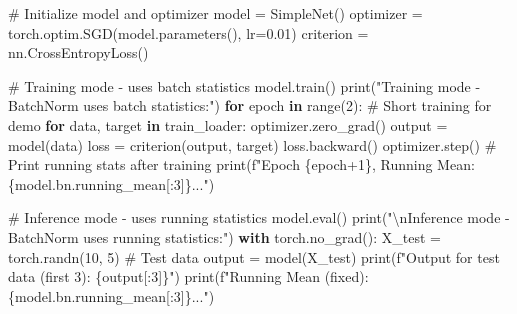 \documentclass[
  letterpaper,
  DIV=11,
  numbers=noendperiod]{scrreprt}
\newenvironment{Shaded}{\begin{snugshade}}{\end{snugshade}}
\newcommand{\BuiltInTok}[1]{\textcolor[rgb]{0.00,0.23,0.31}{#1}}
\newcommand{\CharTok}[1]{\textcolor[rgb]{0.13,0.47,0.30}{#1}}
\newcommand{\CommentTok}[1]{\textcolor[rgb]{0.37,0.37,0.37}{#1}}
\newcommand{\ControlFlowTok}[1]{\textcolor[rgb]{0.00,0.23,0.31}{\textbf{#1}}}
\newcommand{\DecValTok}[1]{\textcolor[rgb]{0.68,0.00,0.00}{#1}}
\newcommand{\FloatTok}[1]{\textcolor[rgb]{0.68,0.00,0.00}{#1}}
\newcommand{\KeywordTok}[1]{\textcolor[rgb]{0.00,0.23,0.31}{\textbf{#1}}}
\newcommand{\NormalTok}[1]{\textcolor[rgb]{0.00,0.23,0.31}{#1}}
\newcommand{\OperatorTok}[1]{\textcolor[rgb]{0.37,0.37,0.37}{#1}}
\newcommand{\SpecialCharTok}[1]{\textcolor[rgb]{0.37,0.37,0.37}{#1}}
\newcommand{\SpecialStringTok}[1]{\textcolor[rgb]{0.13,0.47,0.30}{#1}}
\newcommand{\StringTok}[1]{\textcolor[rgb]{0.13,0.47,0.30}{#1}}
\begin{document}
\begin{Shaded}
\begin{Highlighting}[]
\CommentTok{\# Initialize model and optimizer}
\NormalTok{model }\OperatorTok{=}\NormalTok{ SimpleNet()}
\NormalTok{optimizer }\OperatorTok{=}\NormalTok{ torch.optim.SGD(model.parameters(), lr}\OperatorTok{=}\FloatTok{0.01}\NormalTok{)}
\NormalTok{criterion }\OperatorTok{=}\NormalTok{ nn.CrossEntropyLoss()}

\CommentTok{\# Training mode {-} uses batch statistics}
\NormalTok{model.train()}
\BuiltInTok{print}\NormalTok{(}\StringTok{"Training mode {-} BatchNorm uses batch statistics:"}\NormalTok{)}
\ControlFlowTok{for}\NormalTok{ epoch }\KeywordTok{in} \BuiltInTok{range}\NormalTok{(}\DecValTok{2}\NormalTok{):  }\CommentTok{\# Short training for demo}
    \ControlFlowTok{for}\NormalTok{ data, target }\KeywordTok{in}\NormalTok{ train\_loader:}
\NormalTok{        optimizer.zero\_grad()}
\NormalTok{        output }\OperatorTok{=}\NormalTok{ model(data)}
\NormalTok{        loss }\OperatorTok{=}\NormalTok{ criterion(output, target)}
\NormalTok{        loss.backward()}
\NormalTok{        optimizer.step()}
    \CommentTok{\# Print running stats after training}
    \BuiltInTok{print}\NormalTok{(}\SpecialStringTok{f"Epoch }\SpecialCharTok{\{}\NormalTok{epoch}\OperatorTok{+}\DecValTok{1}\SpecialCharTok{\}}\SpecialStringTok{, Running Mean: }\SpecialCharTok{\{}\NormalTok{model}\SpecialCharTok{.}\NormalTok{bn}\SpecialCharTok{.}\NormalTok{running\_mean[:}\DecValTok{3}\NormalTok{]}\SpecialCharTok{\}}\SpecialStringTok{..."}\NormalTok{)}

\CommentTok{\# Inference mode {-} uses running statistics}
\NormalTok{model.}\BuiltInTok{eval}\NormalTok{()}
\BuiltInTok{print}\NormalTok{(}\StringTok{"}\CharTok{\textbackslash{}n}\StringTok{Inference mode {-} BatchNorm uses running statistics:"}\NormalTok{)}
\ControlFlowTok{with}\NormalTok{ torch.no\_grad():}
\NormalTok{    X\_test }\OperatorTok{=}\NormalTok{ torch.randn(}\DecValTok{10}\NormalTok{, }\DecValTok{5}\NormalTok{)  }\CommentTok{\# Test data}
\NormalTok{    output }\OperatorTok{=}\NormalTok{ model(X\_test)}
    \BuiltInTok{print}\NormalTok{(}\SpecialStringTok{f"Output for test data (first 3): }\SpecialCharTok{\{}\NormalTok{output[:}\DecValTok{3}\NormalTok{]}\SpecialCharTok{\}}\SpecialStringTok{"}\NormalTok{)}
    \BuiltInTok{print}\NormalTok{(}\SpecialStringTok{f"Running Mean (fixed): }\SpecialCharTok{\{}\NormalTok{model}\SpecialCharTok{.}\NormalTok{bn}\SpecialCharTok{.}\NormalTok{running\_mean[:}\DecValTok{3}\NormalTok{]}\SpecialCharTok{\}}\SpecialStringTok{..."}\NormalTok{)}
\end{Highlighting}
\end{Shaded}
\end{document}
